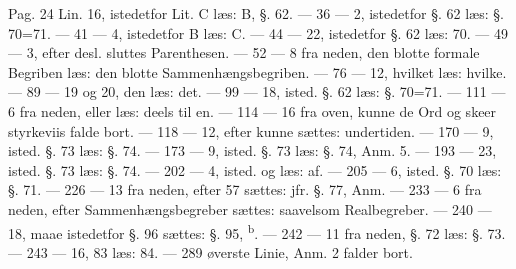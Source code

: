 \documentclass[12pt]{book}
\def\\{ }%
\begin{document}
\begin{flushleft}
Pag. 24 Lin. 16, istedetfor Lit. C læs: B, §. 62.\\
--- 36 --- 2, istedetfor §. 62 læs: §. 70=71.\\
--- 41 --- 4, istedetfor B læs: C.\\
--- 44 --- 22, istedetfor §. 62 læs: 70.\\
--- 49 --- 3, efter desl. sluttes Parenthesen.\\
--- 52 --- 8 fra neden, den blotte formale Begriben læs: den blotte
Sammenhængsbegriben.\\
--- 76 --- 12, hvilket læs: hvilke.\\
--- 89 --- 19 og 20, den læs: det.\\
--- 99 --- 18, isted. §. 62 læs: §. 70=71.\\
--- 111 --- 6 fra neden, eller læs: deels til en.\\
--- 114 --- 16 fra oven, kunne de Ord og skeer styrkeviis falde bort.\\
--- 118 --- 12, efter kunne sættes: undertiden.\\
--- 170 --- 9, isted. §. 73 læs: §. 74.\\
--- 173 --- 9, isted. §. 73 læs: §. 74, Anm. 5.\\
--- 193 --- 23, isted. §. 73 læs: §. 74.\\
--- 202 --- 4, isted. og læs: af.\\
--- 205 --- 6, isted. §. 70 læs: §. 71.\\
--- 226 --- 13 fra neden, efter 57 sættes: jfr. §. 77, Anm.\\
--- 233 --- 6 fra neden, efter Sammenhængsbegreber sættes: saavelsom
Realbegreber.\\
--- 240 --- 18, maae istedetfor §. 96 sættes: §. 95, \textsuperscript{b}.\\
--- 242 --- 11 fra neden, §. 72 læs: §. 73.\\
--- 243 --- 16, 83 læs: 84.\\
--- 289 øverste Linie, Anm. 2 falder bort.
\end{flushleft}
\end{document}

